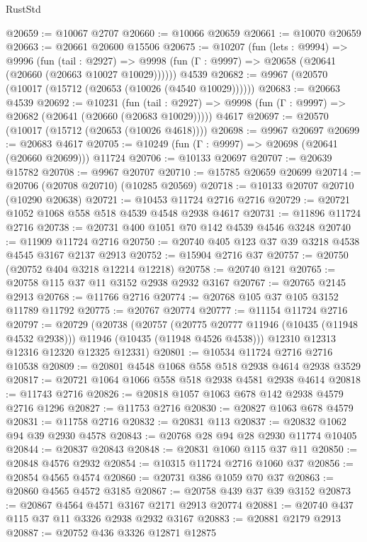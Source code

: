 \begin{lexlean}{RustStd}
\begin{coremodule}
@20659 := @10067 @2707
@20660 := @10066 @20659
@20661 := @10070 @20659
@20663 := @20661 @20600 @15506
@20675 := @10207
    (fun (lets : @9994) =>
    @9996
      (fun (tail : @2927) =>
      @9998 (fun (Γ : @9997) => @20658 (@20641 (@20660 (@20663 @10027 @10029))))))
    @4539
@20682 := @9967 (@20570 (@10017 (@15712 (@20653 (@10026 (@4540 @10029))))))
@20683 := @20663 @4539
@20692 := @10231
    (fun (tail : @2927) => @9998 (fun (Γ : @9997) => @20682 (@20641 (@20660 (@20683 @10029)))))
    @4617
@20697 := @20570 (@10017 (@15712 (@20653 (@10026 @4618))))
@20698 := @9967 @20697
@20699 := @20683 @4617
@20705 := @10249 (fun (Γ : @9997) => @20698 (@20641 (@20660 @20699))) @11724
@20706 := @10133 @20697
@20707 := @20639 @15782
@20708 := @9967 @20707
@20710 := @15785 @20659 @20699
@20714 := @20706 (@20708 @20710) (@10285 @20569)
@20718 := @10133 @20707 @20710 (@10290 @20638)
@20721 := @10453 @11724 @2716 @2716
@20729 := @20721 @1052 @1068 @558 @518 @4539 @4548 @2938 @4617
@20731 := @11896 @11724 @2716
@20738 := @20731 @400 @1051 @70 @142 @4539 @4546 @3248
@20740 := @11909 @11724 @2716
@20750 := @20740 @405 @123 @37 @39 @3218 @4538 @4545 @3167 @2137 @2913
@20752 := @15904 @2716 @37
@20757 := @20750 (@20752 @404 @3218 @12214 @12218)
@20758 := @20740 @121
@20765 := @20758 @115 @37 @11 @3152 @2938 @2932 @3167
@20767 := @20765 @2145 @2913
@20768 := @11766 @2716
@20774 := @20768 @105 @37 @105 @3152 @11789 @11792
@20775 := @20767 @20774
@20777 := @11154 @11724 @2716
@20797 := @20729
    (@20738
      (@20757
        (@20775 @20777 @11946 (@10435 (@11948 @4532 @2938)))
        @11946
        (@10435 (@11948 @4526 @4538)))
      @12310
      @12313
      @12316
      @12320
      @12325
      @12331)
@20801 := @10534 @11724 @2716 @2716 @10538
@20809 := @20801 @4548 @1068 @558 @518 @2938 @4614 @2938 @3529
@20817 := @20721 @1064 @1066 @558 @518 @2938 @4581 @2938 @4614
@20818 := @11743 @2716
@20826 := @20818 @1057 @1063 @678 @142 @2938 @4579 @2716 @1296
@20827 := @11753 @2716
@20830 := @20827 @1063 @678 @4579
@20831 := @11758 @2716
@20832 := @20831 @113
@20837 := @20832 @1062 @94 @39 @2930 @4578
@20843 := @20768 @28 @94 @28 @2930 @11774 @10405
@20844 := @20837 @20843
@20848 := @20831 @1060 @115 @37 @11
@20850 := @20848 @4576 @2932
@20854 := @10315 @11724 @2716 @1060 @37
@20856 := @20854 @4565 @4574
@20860 := @20731 @386 @1059 @70 @37
@20863 := @20860 @4565 @4572 @3185
@20867 := @20758 @439 @37 @39 @3152
@20873 := @20867 @4564 @4571 @3167 @2171 @2913 @20774
@20881 := @20740 @437 @115 @37 @11 @3326 @2938 @2932 @3167
@20883 := @20881 @2179 @2913
@20887 := @20752 @436 @3326 @12871 @12875

\end{coremodule}
\end{lexlean}
